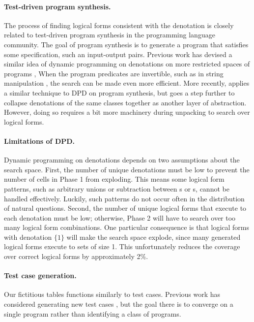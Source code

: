\paragraph{Test-driven program synthesis.}
The process of finding logical forms consistent
with the denotation is closely related
to test-driven program synthesis in the
programming language community.
The goal of program synthesis is to generate a program
that satisfies some specification,
such an input-output pairs.
Previous work has devised a similar idea
of dynamic programming on denotations
on more restricted spaces of programs
\cite{lau03traces,liang10programs,feser2015synthesizing,yaghmazadeh2016hierarchy},
When the program predicates are invertible,
such as in string manipulation
\cite{gulwani2011automating, parisotto2017sql, devlin2017robustfill},
the search can be made even more efficient.
More recently, \citet{wang2017program}
applies a similar technique to DPD on program synthesis,
but goes a step further to collapse
denotations of the same classes together
as another layer of abstraction.
However, doing so requires a bit more machinery
during unpacking to search over
logical forms.

\paragraph{Limitations of DPD.}
Dynamic programming on denotations depends on two assumptions
about the search space.
First, the number of unique denotations must be low
to prevent the number of cells in Phase 1 from exploding.
This means some logical form patterns, such as
arbitrary unions or subtraction between s or s,
cannot be handled effectively.
Luckily, such patterns do not occur often in the distribution
of natural questions.
Second, the number of unique logical forms that execute
to each denotation must be low; otherwise,
Phase 2 will have to search over too many logical form combinations.
One particular consequence is that  logical forms with
denotation $\{1\}$ will make the search space explode,
since many generated logical forms execute to sets of size 1.
This unfortunately reduces the coverage over correct logical forms
by approximately 2\%.

\paragraph{Test case generation.}
Our fictitious tables
functions similarly to test cases.
Previous work has considered generating
new test cases \cite{miller1990empirical},
but the goal there is to converge on a single program
rather than identifying a class of programs.

